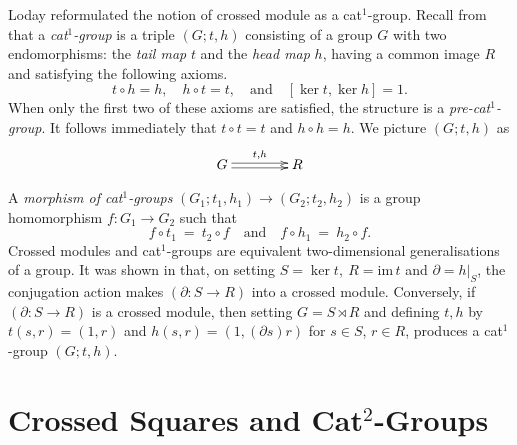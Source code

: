 \documentclass{ws-ijac}
\newcommand{\im}    {\mathrm{im}\,}
\begin{document}
Loday reformulated the notion of crossed module as a cat$^{1}$-group. 
Recall from \cite{Loday} that a \emph{cat$^{1}$-group} is a triple $(G;t,h)$ consisting of a group $G$ with two endomorphisms: 
the \emph{tail map} $t$ and the \emph{head map} $h$, 
having a common image $R$ and satisfying the following axioms. 
\begin{equation} \label{cat1-axioms} 
t \circ h = h, \quad  
h \circ t = t, 
\quad \mbox{and}\quad  [\ker t,\ker h] = 1. 
\end{equation} 
When only the first two of these axioms are satisfied, the structure is a 
\emph{pre-cat$^1$-group}. 
It follows immediately that $t \circ t = t$ and $h \circ h = h$. 
We picture $(G;t,h)$ as 
\[
\xymatrix@R=40pt@C=40pt
{ G \ar@<+0.4ex>[r]^{t,h} \ar@<-0.4ex>[r]  &  R }
\] 

A \emph{morphism of cat}$^{1}$\emph{-groups} 
$(G_{1};t_1,h_1) \rightarrow (G_{2};t_2,h_2)$ 
is a group homomorphism $f : G_{1} \rightarrow G_{2}$ such that 
\[ 
f \circ t_1 ~=~ t_2 \circ f  
\quad\mbox{and}\quad 
f \circ h_1 ~=~ h_2 \circ f.
\] 
Crossed modules and cat$^{1}$-groups are equivalent two-dimensional 
generalisations of a group. 
It was shown in \cite[Lemma 2.2]{Loday} that, 
on setting $S = \ker t,~ R = \im t$ and $\partial = h|_{S}$, 
the conjugation action makes $(\partial : S \rightarrow R)$ 
into a crossed module. 
Conversely, if $(\partial : S \rightarrow R)$ is a crossed module, 
then setting $G = S \rtimes R$ and defining $t,h$ by $t(s,r) = (1,r)$ 
and $h(s,r) = (1,(\partial s)r)$ for $s \in S$, $r \in R$, 
produces a cat$^{1}$-group $(G;t,h)$.


\section{Crossed Squares and Cat$^{2}$-Groups}
\end{document}
